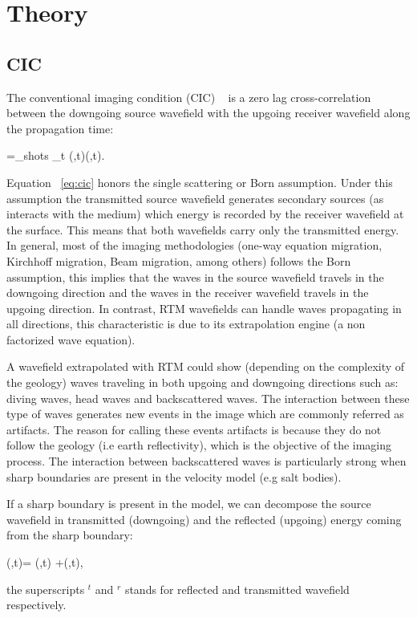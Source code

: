 \section{Theory}

\subsection{CIC}
The conventional imaging condition (CIC) ~\citep{claerbout:467}
is a zero lag cross-correlation between the downgoing source wavefield with the upgoing 
receiver wavefield along the propagation time:

\beq
\R=\sum_{shots} \sum_{t} \US(\xx,t)\UR(\xx,t).
\label{eq:cic}
\eeq

Equation ~\ref{eq:cic} honors the single scattering or Born assumption. Under this assumption the transmitted
source wavefield generates secondary sources (as interacts with the medium) which energy is recorded by the 
receiver wavefield at the surface. This means that both wavefields carry only the transmitted energy. In general,
 most of the imaging methodologies (one-way equation migration, Kirchhoff migration, Beam migration, among others)
follows the Born assumption, this implies that the waves in the source wavefield travels in the downgoing 
direction and the waves in the receiver wavefield travels in the upgoing direction. In contrast, RTM wavefields
can handle waves propagating in all directions, this characteristic is due to its extrapolation engine
(a non factorized wave equation).

A wavefield extrapolated with RTM could show (depending on the complexity of the geology) waves traveling in both
upgoing and downgoing directions such as: diving waves, head waves and backscattered waves. The interaction between
 these type of waves generates new events in the image which are commonly referred as artifacts. The reason for calling
 these events artifacts is because they do not follow the geology (i.e earth reflectivity), which is the objective 
of the imaging process. The interaction between backscattered waves is particularly strong when
sharp boundaries are present in the velocity model (e.g salt bodies).

If a sharp boundary is present in the model, we can decompose the source wavefield in transmitted (downgoing) 
 and the reflected (upgoing) energy coming from the sharp boundary:

\beq
\US(\xx,t)= \USr(\xx,t) +\USt(\xx,t),
\label{eq:ssplit}
\eeq

the superscripts $^t$ and $^r$ stands for reflected and transmitted wavefield respectively. 

